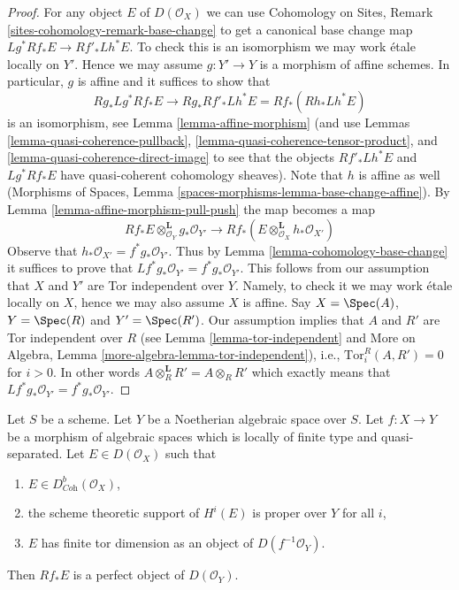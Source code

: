 \begin{proof}
For any object $E$ of $D(\mathcal{O}_X)$ we can use
Cohomology on Sites, Remark \ref{sites-cohomology-remark-base-change}
to get a canonical base change map $Lg^*Rf_*E \to Rf'_*Lh^*E$. To check this
is an isomorphism we may work \'etale locally on $Y'$. Hence we may assume
$g : Y' \to Y$ is a morphism of affine schemes. In particular, $g$
is affine and it suffices to show that
$$
Rg_*Lg^*Rf_*E \to Rg_*Rf'_*Lh^*E = Rf_*(Rh_* Lh^* E)
$$
is an isomorphism, see Lemma \ref{lemma-affine-morphism}
(and use Lemmas \ref{lemma-quasi-coherence-pullback},
\ref{lemma-quasi-coherence-tensor-product}, and
\ref{lemma-quasi-coherence-direct-image}
to see that the objects $Rf'_*Lh^*E$ and $Lg^*Rf_*E$
have quasi-coherent cohomology sheaves). Note that $h$ is
affine as well (Morphisms of Spaces, Lemma
\ref{spaces-morphisms-lemma-base-change-affine}).
By Lemma \ref{lemma-affine-morphism-pull-push} the map becomes a map
$$
Rf_*E \otimes_{\mathcal{O}_Y}^\mathbf{L} g_*\mathcal{O}_{Y'}
\longrightarrow
Rf_*(E \otimes_{\mathcal{O}_X}^\mathbf{L} h_*\mathcal{O}_{X'})
$$
Observe that $h_*\mathcal{O}_{X'} = f^*g_*\mathcal{O}_{Y'}$. Thus by
Lemma \ref{lemma-cohomology-base-change} it suffices to prove that
$Lf^*g_*\mathcal{O}_{Y'} = f^*g_*\mathcal{O}_{Y'}$. This follows from our
assumption that $X$ and $Y'$ are Tor independent over $Y$. Namely, to
check it we may work \'etale locally on $X$, hence we may also assume $X$
is affine. Say $X = \Spec(A)$, $Y = \Spec(R)$ and $Y' = \Spec(R')$.
Our assumption implies that $A$ and $R'$ are Tor independent over $R$
(see
Lemma \ref{lemma-tor-independent}
and
More on Algebra, Lemma \ref{more-algebra-lemma-tor-independent}), i.e.,
$\text{Tor}_i^R(A, R') = 0$ for $i > 0$. In other words
$A \otimes_R^\mathbf{L} R' = A \otimes_R R'$ which exactly means
that $Lf^*g_*\mathcal{O}_{Y'} = f^*g_*\mathcal{O}_{Y'}$.
\end{proof}

\begin{lemma}
\label{lemma-perfect-direct-image}
Let $S$ be a scheme. Let $Y$ be a Noetherian algebraic space over $S$.
Let $f : X \to Y$ be a morphism of algebraic spaces which is locally of
finite type and quasi-separated. Let $E \in D(\mathcal{O}_X)$ such that
\begin{enumerate}
\item $E \in D^b_{\textit{Coh}}(\mathcal{O}_X)$,
\item the scheme theoretic support of $H^i(E)$ is proper over $Y$ for all $i$,
\item $E$ has finite tor dimension as an object of $D(f^{-1}\mathcal{O}_Y)$.
\end{enumerate}
Then $Rf_*E$ is a perfect object of $D(\mathcal{O}_Y)$.
\end{lemma}

